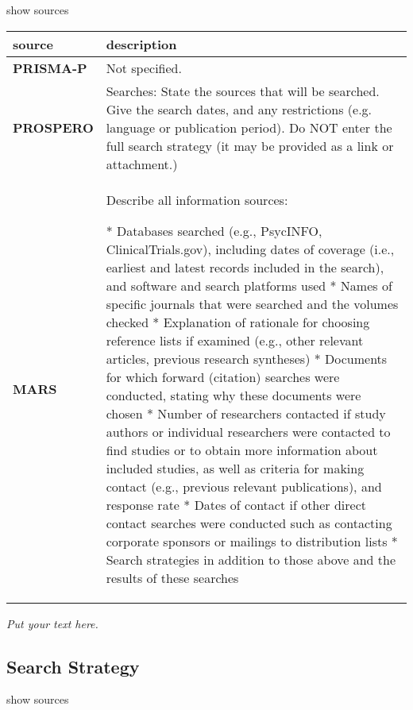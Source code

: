 \documentclass[]{article}
\begin{document}
show sources

\hypertarget{soslar}{}
\begin{table}[H]
\centering
\begin{tabular}{>{\bfseries}l|l}
\hline
\rowcolor[HTML]{ececec}  source & description\\
\hline
PRISMA-P & Not specified.\\
\hline
PROSPERO & Searches: State the sources that will be searched. Give the search dates, and any restrictions (e.g. language or
publication period). Do NOT enter the full search strategy (it may be provided as a link or attachment.)\\
\hline
MARS & Describe all information sources:

* Databases searched (e.g., PsycINFO, ClinicalTrials.gov), including dates of coverage (i.e., earliest and latest records included in the search), and software and search platforms used
* Names of specific journals that were searched and the volumes checked
* Explanation of rationale for choosing reference lists if examined (e.g., other relevant articles, previous research
syntheses)
* Documents for which forward (citation) searches were conducted, stating why these documents were chosen
* Number of researchers contacted if study authors or individual researchers were contacted to find studies or to obtain more information about included studies, as well as criteria for making contact (e.g., previous relevant publications), and response rate
* Dates of contact if other direct contact searches were conducted such as contacting corporate sponsors or mailings to distribution lists
* Search strategies in addition to those above and the results of these searches\\
\hline
\end{tabular}
\end{table}

\emph{Put your text here.}

\hypertarget{search-strategy}{%
\subsection{Search Strategy}\label{search-strategy}}

show sources
\end{document}
